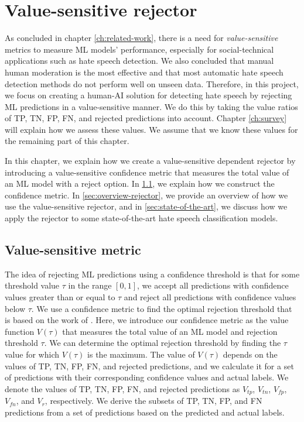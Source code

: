 \chapter{Value-sensitive rejector}
\label{ch:rejector}
As concluded in chapter \ref{ch:related-work}, there is a need for \textit{value-sensitive} metrics to measure ML models' performance, especially for social-technical applications such as hate speech detection.
%
We also concluded that manual human moderation is the most effective and that most automatic hate speech detection methods do not perform well on unseen data.
%
Therefore, in this project, we focus on creating a human-AI solution for detecting hate speech by rejecting ML predictions in a value-sensitive manner.
%
We do this by taking the value ratios of TP, TN, FP, FN, and rejected predictions into account.
%
%
Chapter \ref{ch:survey} will explain how we assess these values.
%
We assume that we know these values for the remaining part of this chapter.
%

%
In this chapter, we explain how we create a value-sensitive dependent rejector by introducing a value-sensitive confidence metric that measures the total value of an ML model with a reject option.
%
In \ref{sec:value-metric}, we explain how we construct the confidence metric.
%
In \ref{sec:overview-rejector}, we provide an overview of how we use the value-sensitive rejector, and in \ref{sec:state-of-the-art}, we discuss how we apply the rejector to some state-of-the-art hate speech classification models.

\section{Value-sensitive metric}
\label{sec:value-metric}
The idea of rejecting ML predictions using a confidence threshold is that for some threshold value $\tau$ in the range $[0, 1]$, we accept all predictions with confidence values greater than or equal to $\tau$ and reject all predictions with confidence values below $\tau$.
%
We use a confidence metric to find the optimal rejection threshold that is based on the work of \citet{de2000reject}.
%
Here, we introduce our confidence metric as the value function $V(\tau)$ that measures the total value of an ML model and rejection threshold $\tau$.
%
We can determine the optimal rejection threshold by finding the $\tau$ value for which $V(\tau)$ is the maximum.
%
The value of $V(\tau)$ depends on the values of TP, TN, FP, FN, and rejected predictions, and we calculate it for a set of predictions with their corresponding confidence values and actual labels.
%
We denote the values of TP, TN, FP, FN, and rejected predictions as $V_{tp}$, $V_{tn}$, $V_{fp}$, $V_{fn}$, and $V_r$, respectively.
%
We derive the subsets of TP, TN, FP, and FN predictions from a set of predictions based on the predicted and actual labels.
%

